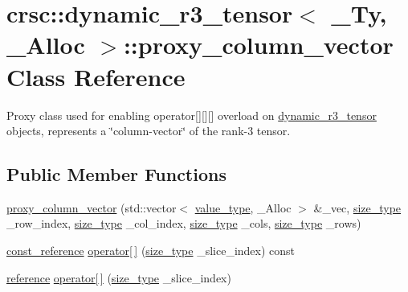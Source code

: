\hypertarget{classcrsc_1_1dynamic__r3__tensor_1_1proxy__column__vector}{}\section{crsc\+:\+:dynamic\+\_\+r3\+\_\+tensor$<$ \+\_\+\+Ty, \+\_\+\+Alloc $>$\+:\+:proxy\+\_\+column\+\_\+vector Class Reference}
\label{classcrsc_1_1dynamic__r3__tensor_1_1proxy__column__vector}


Proxy class used for enabling operator\mbox{[}\mbox{]}\mbox{[}\mbox{]}\mbox{[}\mbox{]} overload on \hyperlink{classcrsc_1_1dynamic__r3__tensor}{dynamic\+\_\+r3\+\_\+tensor} objects, represents a \char`\"{}column-\/vector\char`\"{} of the rank-\/3 tensor.  


\subsection*{Public Member Functions}
\begin{DoxyCompactItemize}
\item 
\hyperlink{classcrsc_1_1dynamic__r3__tensor_1_1proxy__column__vector_a2531ad68edf9cdaf8fd46ffac769e986}{proxy\+\_\+column\+\_\+vector} (std\+::vector$<$ \hyperlink{classcrsc_1_1dynamic__r3__tensor_ad7fb44388c819fb7947771da18bb625b}{value\+\_\+type}, \+\_\+\+Alloc $>$ \&\+\_\+vec, \hyperlink{classcrsc_1_1dynamic__r3__tensor_a00e5f1f46f16d0c0ac1cffa6bd0fe862}{size\+\_\+type} \+\_\+row\+\_\+index, \hyperlink{classcrsc_1_1dynamic__r3__tensor_a00e5f1f46f16d0c0ac1cffa6bd0fe862}{size\+\_\+type} \+\_\+col\+\_\+index, \hyperlink{classcrsc_1_1dynamic__r3__tensor_a00e5f1f46f16d0c0ac1cffa6bd0fe862}{size\+\_\+type} \+\_\+cols, \hyperlink{classcrsc_1_1dynamic__r3__tensor_a00e5f1f46f16d0c0ac1cffa6bd0fe862}{size\+\_\+type} \+\_\+rows)
\item 
\hyperlink{classcrsc_1_1dynamic__r3__tensor_a5dd99c21cd4dc396a2ae225f90301cdc}{const\+\_\+reference} \hyperlink{classcrsc_1_1dynamic__r3__tensor_1_1proxy__column__vector_a7f00ae59eb6abe61259bee8aaf9bc5d8}{operator\mbox{[}$\,$\mbox{]}} (\hyperlink{classcrsc_1_1dynamic__r3__tensor_a00e5f1f46f16d0c0ac1cffa6bd0fe862}{size\+\_\+type} \+\_\+slice\+\_\+index) const 
\item 
\hyperlink{classcrsc_1_1dynamic__r3__tensor_a1a4d3cf01c93ee5b24b927236b1fd4b1}{reference} \hyperlink{classcrsc_1_1dynamic__r3__tensor_1_1proxy__column__vector_a667ab05c1d9d8e46263b6991cdba338c}{operator\mbox{[}$\,$\mbox{]}} (\hyperlink{classcrsc_1_1dynamic__r3__tensor_a00e5f1f46f16d0c0ac1cffa6bd0fe862}{size\+\_\+type} \+\_\+slice\+\_\+index)
\end{DoxyCompactItemize}
